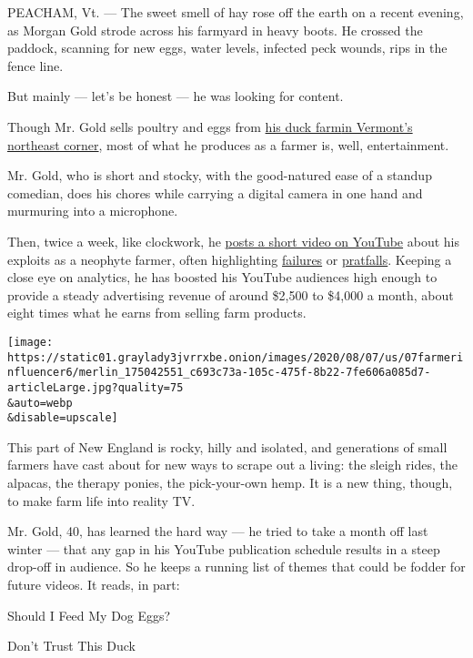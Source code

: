 PEACHAM, Vt. --- The sweet smell of hay rose off the earth on a recent
evening, as Morgan Gold strode across his farmyard in heavy boots. He
crossed the paddock, scanning for new eggs, water levels, infected peck
wounds, rips in the fence line.

But mainly --- let's be honest --- he was looking for content.

Though Mr. Gold sells poultry and eggs from
\href{https://www.youtube.com/channel/UCjl3zDun9SazYI0UWWu6_1A}{his duck
farm}\textbf{\href{https://www.youtube.com/channel/UCjl3zDun9SazYI0UWWu6_1A}{}}\href{https://www.youtube.com/channel/UCjl3zDun9SazYI0UWWu6_1A}{in
Vermont's northeast corner}, most of what he produces as a farmer is,
well, entertainment.

Mr. Gold, who is short and stocky, with the good-natured ease of a
standup comedian, does his chores while carrying a digital camera in one
hand and murmuring into a microphone.

Then, twice a week, like clockwork, he
\href{https://www.youtube.com/watch?v=XU-ylxJ55HQ\&t=130s}{posts a short
video on YouTube} about his exploits as a neophyte farmer, often
highlighting
\href{https://www.youtube.com/watch?v=mYmBQ-gv9gE\&t=20s}{failures} or
\href{https://www.youtube.com/watch?v=Kv2Q9jq8kxw}{pratfalls}. Keeping a
close eye on analytics, he has boosted his YouTube audiences high enough
to provide a steady advertising revenue of around \$2,500 to \$4,000 a
month, about eight times what he earns from selling farm products.

\texttt{[image: https://static01.graylady3jvrrxbe.onion/images/2020/08/07/us/07farmerinfluencer6/merlin\_175042551\_c693c73a-105c-475f-8b22-7fe606a085d7-articleLarge.jpg?quality=75\\\&auto=webp\\\&disable=upscale]}

This part of New England is rocky, hilly and isolated, and generations
of small farmers have cast about for new ways to scrape out a living:
the sleigh rides, the alpacas, the therapy ponies, the pick-your-own
hemp. It is a new thing, though, to make farm life into reality TV.

Mr. Gold, 40, has learned the hard way --- he tried to take a month off
last winter --- that any gap in his YouTube publication schedule results
in a steep drop-off in audience. So he keeps a running list of themes
that could be fodder for future videos. It reads, in part:

Should I Feed My Dog Eggs?

Don't Trust This Duck

